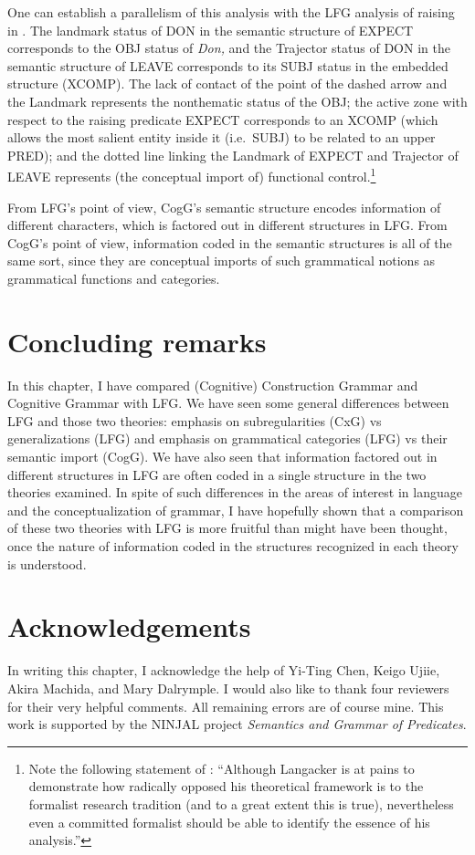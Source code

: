 \documentclass[output=paper,japanesefont,hidelinks]{langscibook}
\begin{document}
\largerpage[2]
One can establish a parallelism of this analysis with the LFG analysis of raising in \citet{bresnan1982control-complementation}. The landmark status of DON in the semantic structure of EXPECT corresponds to the OBJ status of \textit{Don,} and the Trajector status of DON in the semantic structure of LEAVE corresponds to its SUBJ status in the embedded structure (XCOMP). The lack of contact of the point of the dashed arrow and the Landmark represents the nonthematic status of the OBJ; the active zone with respect to the raising predicate EXPECT corresponds to an XCOMP (which allows the most salient entity inside it (i.e.\ SUBJ) to be related to an upper PRED); and the dotted line linking the Landmark of EXPECT and Trajector of LEAVE represents (the conceptual import of) functional control.\footnote{Note the following statement of \citet[108]{Croft1999}: ``Although Langacker is at pains to demonstrate how radically opposed his theoretical framework is to the formalist research tradition (and to a great extent this is true), nevertheless even a committed formalist should be able to identify the essence of his analysis.''}

From LFG's point of view, CogG's semantic structure encodes information of different characters, which is factored out in different structures in LFG. From CogG's point of view, information coded in the semantic structures is all of the same sort, since they are conceptual imports of such grammatical notions as grammatical functions and categories.

\section{Concluding remarks}
\label{sec:cg:4}

In this chapter, I have compared (Cognitive) Construction Grammar and Cognitive Grammar with LFG. We have seen some general differences between LFG and those two theories: emphasis on subregularities (CxG) vs generalizations (LFG) and emphasis on grammatical categories (LFG) vs their semantic import (CogG). We have also seen that information factored out in different structures in LFG are often coded in a single structure in the two theories examined. In spite of such differences in the areas of interest in language and the conceptualization of grammar, I have hopefully shown that a comparison of these two theories with LFG is more fruitful than might have been thought, once the nature of information coded in the structures recognized in each theory is understood.

\section*{Acknowledgements}
In writing this chapter, I acknowledge the help of Yi-Ting Chen, Keigo Ujiie, Akira Machida, and Mary Dalrymple. I would also like to thank four reviewers for their very helpful comments. All remaining errors are of course mine.
This work is supported by the NINJAL project \textit{Semantics and Grammar of Predicates}.

\sloppy
\printbibliography[heading=subbibliography,notkeyword=this]
\end{document}

